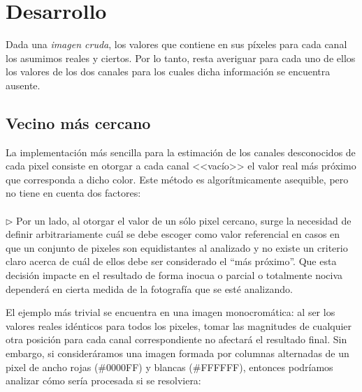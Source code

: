 \documentclass[a4paper]{article}
\begin{document}
\newpage
\section{Desarrollo}

Dada una \textit{imagen cruda}, los valores que contiene en sus píxeles para cada canal los asumimos reales y ciertos. Por lo tanto, resta averiguar para cada uno de ellos los valores de los dos canales para los cuales dicha información se encuentra ausente.

\subsection{Vecino m\'as cercano}
La implementación más sencilla para la estimación de los canales desconocidos de cada pixel consiste en otorgar a cada canal <<vacío>> el valor real m\'as pr\'oximo que corresponda a dicho color. Este m\'etodo es algor\'itmicamente asequible, pero no tiene en cuenta dos factores: \\
\\

$\triangleright$ Por un lado, al otorgar el valor de un sólo pixel cercano, surge la necesidad de definir arbitrariamente cuál se debe escoger como valor referencial en casos en que un conjunto de pixeles son equidistantes al analizado y no existe un criterio claro acerca de cuál de ellos debe ser considerado el ``más próximo''. Que esta decisión impacte en el resultado de forma inocua o parcial o totalmente nociva dependerá en cierta medida de la fotografía que se esté analizando.

El ejemplo más trivial se encuentra en una imagen monocromática: al ser los valores reales idénticos para todos los pixeles, tomar las magnitudes de cualquier otra posición para cada canal correspondiente no afectará el resultado final. Sin embargo, si consideráramos una imagen formada por columnas alternadas de un pixel de ancho rojas (\#0000FF) y blancas (\#FFFFFF), entonces podríamos analizar cómo sería procesada si se resolviera:
\end{document}

